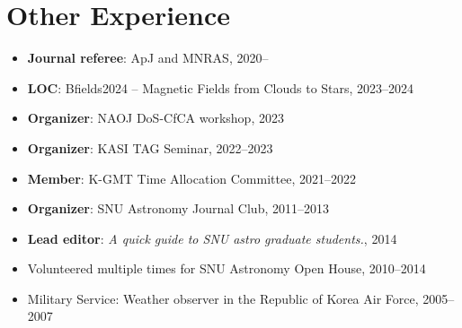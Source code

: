 \documentclass[11pt,letterpaper,roman]{moderncv}        %
\begin{document}


\section{Other Experience}
\begin{itemize}
\setlength\itemsep{0.0em}
\item {\bfseries Journal referee}: ApJ and MNRAS, 2020--
\item {\bfseries LOC}: Bfields2024 -- Magnetic Fields from Clouds to Stars, 2023--2024
\item {\bfseries Organizer}: NAOJ DoS-CfCA workshop, 2023
\item {\bfseries Organizer}: KASI TAG Seminar, 2022--2023
\item {\bfseries Member}: K-GMT Time Allocation Committee, 2021--2022
\item {\bfseries Organizer}: SNU Astronomy Journal Club, 2011--2013
\item {\bfseries Lead editor}: \textit{A quick guide to SNU astro graduate students.}, 2014
\item Volunteered multiple times for SNU Astronomy Open House, 2010--2014
\item Military Service: Weather observer in the Republic of Korea Air Force, 2005--2007
\end{itemize}
\end{document}
